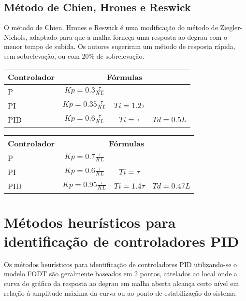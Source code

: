     \subsection{Método de Chien, Hrones e Reswick}
        
        O método de Chien, Hrones e Reswick é uma modificação do método
        de Ziegler-Nichols, adaptado para que a malha forneça uma resposta ao
        degrau com o menor tempo de subida. Os autores sugeriram um método
        de resposta rápida, sem sobrelevação, ou com 20\% de sobrelevação.
        
        \begin{center}
            \begin{tabular}{l*{3}{c}}
Controlador & \multicolumn{3}{c}{Fórmulas} \\
\hline
P   & $Kp = 0.3\frac{\tau}{KL}$     &              & \\
PI  & $Kp = 0.35\frac{\tau}{KL}$ & $Ti = 1.2\tau$ & \\
PID & $Kp = 0.6\frac{\tau}{KL}$ & $Ti = \tau$ & $Td = 0.5L$ \\
            \end{tabular}
        \end{center}

        \newpage

        \begin{center}
            \begin{tabular}{l*{3}{c}}
Controlador & \multicolumn{3}{c}{Fórmulas} \\
\hline
P   & $Kp = 0.7\frac{\tau}{KL}$     &              & \\
PI  & $Kp = 0.6\frac{\tau}{KL}$ & $Ti = \tau$ & \\
PID & $Kp = 0.95\frac{\tau}{KL}$ & $Ti = 1.4\tau$ & $Td = 0.47L$ \\
            \end{tabular}
        \end{center}


\section{Métodos heurísticos para identificação de controladores PID}

    Os métodos heurísticos para identificação de controladores \acs{PID}
    utilizando-se o modelo \acs{FODT} são geralmente baseados em 2 pontos,
    atrelados ao local onde a curva do gráfico da resposta ao degrau em
    malha aberta alcança certo nível em relação à amplitude máxima da curva
    ou ao ponto de estabilização do sistema.
    
